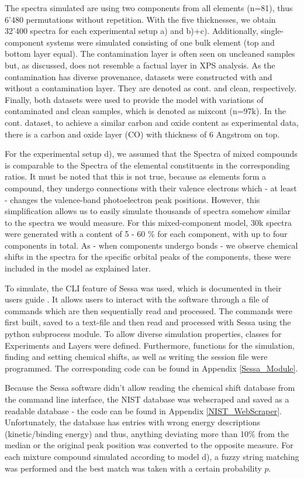 The spectra simulated are using two components from all elements (n=81), thus 6'480 permutations without repetition. With the five thicknesses, we obtain 32'400 spectra for each experimental setup a) and b)+c). Additionally, single-component systems were simulated consisting of one bulk element (top and bottom layer equal). The contamination layer is often seen on uncleaned samples but, as discussed, does not resemble a factual layer in XPS analysis. As the contamination has diverse provenance, datasets were constructed with and without a contamination layer. They are denoted as cont. and clean, respectively. Finally, both datasets were used to provide the model with variations of contaminated and clean samples, which is denoted as mixcont (n=97k).
In the cont. dataset, to achieve a similar carbon and oxide content as experimental data, there is a carbon and oxide layer (CO) with thickness of 6 Angstrom on top.

For the experimental setup d), we assumed that the Spectra of mixed compounds is comparable to the Spectra of the elemental constituents in the corresponding ratios. It must be noted that this is not true, because as elements form a compound, they undergo connections with their valence electrons which - at least - changes the valence-band photoelectron peak positions. However, this simplification allows us to easily simulate thousands of spectra somehow similar to the spectra we would measure. For this mixed-component model, 30k spectra were generated with a content of 5 - 60 \% for each component, with up to four components in total. As - when components undergo bonds - we observe chemical shifts in the spectra for the specific orbital peaks of the components, these were included in the model as explained later.

To simulate, the CLI feature of Sessa was used, which is documented in their users guide \cite{werner_simulation_2021}. It allows users to interact with the software through a file of commands which are then sequentially read and processed. The commands were first built, saved to a text-file and then read and processed with Sessa using the python subprocess module. To allow diverse simulation properties, classes for Experiments and Layers were defined. Furthermore, functions for the simulation, finding and setting chemical shifts, as well as writing the session file were programmed. The corresponding code can be found in Appendix \ref{Sessa_Module}.

Because the Sessa software didn't allow reading the chemical shift database from the command line interface, the NIST database was webscraped and saved as a readable database - the code can be found in Appendix \ref{NIST_WebScraper}. Unfortunately, the database has entries with wrong energy descriptions (kinetic/binding energy) and thus, anything deviating more than 10\% from the median or the original peak position was converted to the opposite measure.
For each mixture compound simulated according to model d), a fuzzy string matching was performed and the best match was taken with a certain probability $p$.


